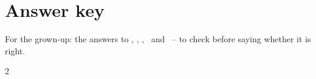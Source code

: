 \section*{Answer key}

For the grown-up: the answers to \lblAdivina, \lblUne, \lblEncuentra,
\lblPalmadas\ and \lblSiNo\ -- to check before saying whether it is
right.

\begin{multicols}{2}
\footnotesize
\begin{itemize}[leftmargin=0mm, label={}, itemsep=2mm, topsep=0mm]

\end{itemize}
\end{multicols}
\newpage
